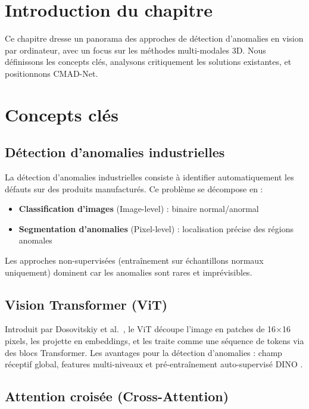 \documentclass[12pt,a4paper,oneside]{report}
\begin{document}
\section*{Introduction du chapitre}

Ce chapitre dresse un panorama des approches de détection d'anomalies en vision par ordinateur, avec un focus sur les méthodes multi-modales 3D. Nous définissons les concepts clés, analysons critiquement les solutions existantes, et positionnons CMAD-Net.

\section{Concepts clés}

\subsection{Détection d'anomalies industrielles}

La détection d'anomalies industrielles consiste à identifier automatiquement les défauts sur des produits manufacturés. Ce problème se décompose en :
\begin{itemize}
    \item \textbf{Classification d'images} (Image-level) : binaire normal/anormal
    \item \textbf{Segmentation d'anomalies} (Pixel-level) : localisation précise des régions anomales
\end{itemize}

Les approches non-supervisées (entraînement sur échantillons normaux uniquement) dominent car les anomalies sont rares et imprévisibles.

\subsection{Vision Transformer (ViT)}

Introduit par Dosovitskiy et al.~\cite{dosovitskiy2021}, le ViT découpe l'image en patches de 16$\times$16 pixels, les projette en embeddings, et les traite comme une séquence de tokens via des blocs Transformer. Les avantages pour la détection d'anomalies : champ réceptif global, features multi-niveaux et pré-entraînement auto-supervisé DINO \cite{caron2021}.

\subsection{Attention croisée (Cross-Attention)}
\end{document}
